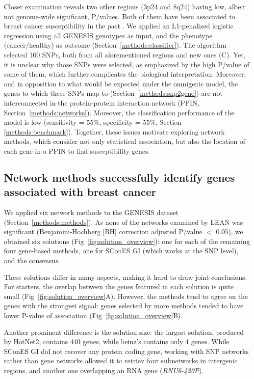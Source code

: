 \documentclass[10pt,letterpaper]{article}
\begin{document}
Closer examination reveals two other regions (3p24 and 8q24) having low, albeit not genome-wide significant, P\=/values. Both of them have been associated to breast cancer susceptibility in the past \cite{brisbin_meta-analysis_2011,search_newly_2009}. We applied an L1-penalized logistic regression using all GENESIS genotypes as input, and the phenotype (cancer/healthy) as outcome (Section~\ref{methods:classifier}). The algorithm selected 100 SNPs, both from all aforementioned regions and new ones (C). Yet, it is unclear why those SNPs were selected, as emphasized by the high P\=/value of some of them, which further complicates the biological interpretation. Moreover, and in opposition to what would be expected under the omnigenic model, the genes to which these SNPs map to (Section~\ref{methods:snp2gene}) are not interconnected in the protein-protein interaction network (PPIN, Section~\ref{methods:networks}). Moreover, the classification performance of the model is low (sensitivity = 55\%, specificity = 55\%, Section \ref{methods:benchmark}). Together, these issues motivate exploring network methods, which consider not only statistical association, but also the location of each gene in a PPIN to find susceptibility genes.

\subsection{Network methods successfully identify genes associated with breast cancer}
\label{results:separate_networks}

We applied six network methods to the GENESIS dataset (Section~\ref{methods:methods}). As none of the networks examined by LEAN was significant (Benjamini-Hochberg [BH] correction adjusted P\=/value $<$ 0.05), we obtained six solutions (Fig~\ref{fig:solution_overview}): one for each of the remaining four gene-based methods, one for SConES GI (which works at the SNP level), and the consensus.

These solutions differ in many aspects, making it hard to draw joint conclusions. For starters, the overlap between the genes featured in each solution is quite small (Fig~\ref{fig:solution_overview}A). However, the methods tend to agree on the genes with the strongest signal: genes selected by more methods tended to have lower P-value of association (Fig~\ref{fig:solution_overview}B).

Another prominent difference is the solution size: the largest solution, produced by HotNet2, contains 440 genes, while heinz's contains only 4 genes. While SConES GI did not recover any protein coding gene, working with SNP networks rather than gene networks allowed it to retriev four subnetworks in intergenic regions, and another one overlapping an RNA gene (\emph{RNU6-420P}).
\end{document}
